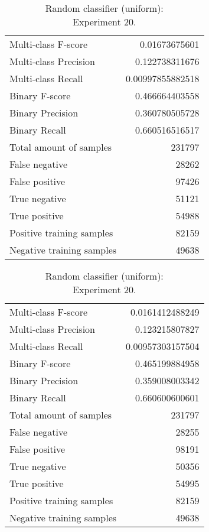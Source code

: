 \begin{table}[H]
\begin{minipage}{0.5\textwidth}
\caption{Random classifier (uniform): \\Experiment 19.}
\centering
\begin{tabular}{l r}
\toprule
Multi-class F-score & 0.01673675601 \\
Multi-class Precision & 0.122738311676 \\
Multi-class Recall & 0.00997855882518 \\
\midrule
Binary F-score & 0.466664403558 \\
Binary Precision & 0.360780505728 \\
Binary Recall & 0.660516516517 \\
\midrule
Total amount of samples & 231797 \\
False negative & 28262 \\
False positive & 97426 \\
True negative & 51121 \\
True positive & 54988 \\
\midrule
Positive training samples & 82159 \\
Negative training samples & 49638 \\
\bottomrule
\end{tabular}
\end{minipage}
\hfillx
\begin{minipage}{0.5\textwidth}
\caption{Random classifier (uniform): \\Experiment 20.}
\centering
\begin{tabular}{l r}
\toprule
Multi-class F-score & 0.0161412488249 \\
Multi-class Precision & 0.123215807827 \\
Multi-class Recall & 0.00957303157504 \\
\midrule
Binary F-score & 0.465199884958 \\
Binary Precision & 0.359008003342 \\
Binary Recall & 0.660600600601 \\
\midrule
Total amount of samples & 231797 \\
False negative & 28255 \\
False positive & 98191 \\
True negative & 50356 \\
True positive & 54995 \\
\midrule
Positive training samples & 82159 \\
Negative training samples & 49638 \\
\bottomrule
\end{tabular}
\end{minipage}
\end{table}
